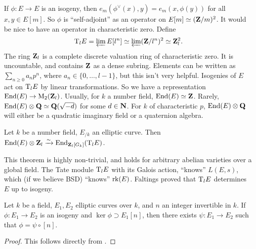 If $\phi:E\to E$ is an isogeny, then $e_m(\phi^\vee(x),y) = e_m(x,\phi(y))$ for 
all $x,y\in E[m]$. So $\phi$ is ``self-adjoint'' as an operator on 
$E[m]\simeq (\mathbf{Z}/m)^2$. It would be nice to have an operator in characteristic 
zero. Define 
\[
  \mathrm{T}_l E = \varprojlim E[l^n] \simeq \varprojlim (\mathbf{Z}/l^n)^2 \simeq \mathbf{Z}_l^2 .
\]
The ring $\mathbf{Z}_l$ is a complete discrete valuation ring of characteristic zero. 
It is uncountable, and contains $\mathbf{Z}$ as a dense subring. Elements can be 
written as $\sum_{n\geqslant 0} a_n p^n$, where $a_n\in \{0,\dots,l-1\}$, but 
this isn't very helpful. Isogenies of $E$ act on $\mathrm{T}_l E$ by linear 
transformations. So we have a representation $\operatorname{End}(E)\to \operatorname{M}_2(\mathbf{Z}_l)$. 
Usually, for $k$ a number field, $\operatorname{End}(E)\simeq \mathbf{Z}$. Rarely, 
$\operatorname{End}(E)\otimes\mathbf{Q}\simeq \mathbf{Q}(\sqrt{-d})$ for some $d\in \mathbf{N}$. For $k$ of 
characteristic $p$, $\operatorname{End}(E)\otimes \mathbf{Q}$ will either be a quadratic imaginary 
field or a quaternion algebra. 

\begin{theorem}[Faltings]
Let $k$ be a number field, $E_{/k}$ an elliptic curve. Then 
$\operatorname{End}(E)\otimes \mathbf{Z}_l\xrightarrow\sim \operatorname{End}_{\mathbf{Z}_l[G_k]}(\mathrm{T}_l E)$. 
\end{theorem}

This theorem is highly non-trivial, and holds for arbitrary abelian varieties 
over a global field. The Tate module $\mathrm{T}_l E$ with its Galois action, 
``knows'' $L(E,s)$, which (if we believe BSD) ``knows'' $\operatorname{rk}(E)$. Faltings 
proved that $\mathrm{T}_l E$ determines $E$ up to isogeny. 

\begin{proposition}\label{prop:isog-invert}
Let $k$ be a field, $E_1,E_2$ elliptic curves over $k$, and $n$ an integer 
invertible in $k$. If $\phi:E_1\to E_2$ is an isogeny and 
$\ker\phi\supset E_1[n]$, then there exists $\psi:E_1\to E_2$ such that 
$\phi=\psi\circ[n]$. 
\end{proposition}
\begin{proof}
This follows directly from \cite[III 4.11]{silverman-2009}. 
\end{proof}

